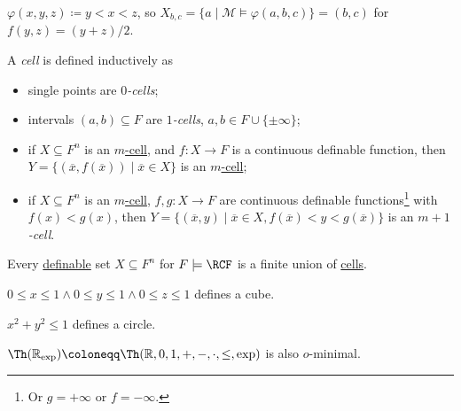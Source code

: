 \begin{eg}
	\(\varphi (x, y, z) \coloneqq y < x < z\), so \(X_{b, c} = \{ a \mid \mathcal{M} \models \varphi (a, b, c) \} = (b, c)\) for \(f(y, z) = (y + z) / 2\).
\end{eg}

\begin{definition}[Cell]\label{def:cell}
	A \emph{cell} is defined inductively as
	\begin{itemize}
		\item single points are \emph{\(0\)-cells};
		\item intervals \((a, b) \subseteq F\) are \emph{\(1\)-cells}, \(a, b \in F \cup \{ \pm \infty \} \);
		\item if \(X \subseteq F^n\) is an \hyperref[def:cell]{\(m\)-cell}, and \(f \colon X \to F\) is a continuous definable function, then \(Y = \{ (\overline{x} , f(\overline{x} )) \mid \overline{x} \in X \} \) is an \hyperref[def:cell]{\(m\)-cell};
		\item if \(X \subseteq F^n\) is an \hyperref[def:cell]{\(m\)-cell}, \(f, g \colon X \to F\)  are continuous definable functions\footnote{Or \(g = +\infty \) or \(f = -\infty \).} with \(f(x) < g(x)\), then \(Y = \{ (\overline{x} , y) \mid \overline{x} \in X, f(\overline{x} ) < y < g(\overline{x} )\} \) is an \emph{\(m+1\)-cell}.
	\end{itemize}
\end{definition}

\begin{center}
\end{center}

\begin{theorem}
	Every \hyperref[def:definable]{definable} set \(X \subseteq F^n\) for \(F \models \RCF\) is a finite union of \hyperref[def:cell]{cells}.
\end{theorem}

\begin{eg}
	\(0 \leq x \leq 1 \land 0 \leq y \leq 1 \land 0 \leq z \leq 1\) defines a cube.
\end{eg}

\begin{eg}
	\(x^2 + y^2 \leq 1\) defines a circle.
\end{eg}

\begin{remark}
	\(\Th(\mathbb{R} _{\exp }) \coloneqq \Th(\mathbb{R} , 0, 1, +, -, \cdot, \leq , \exp ) \) is also \(o\)-minimal.
\end{remark}

